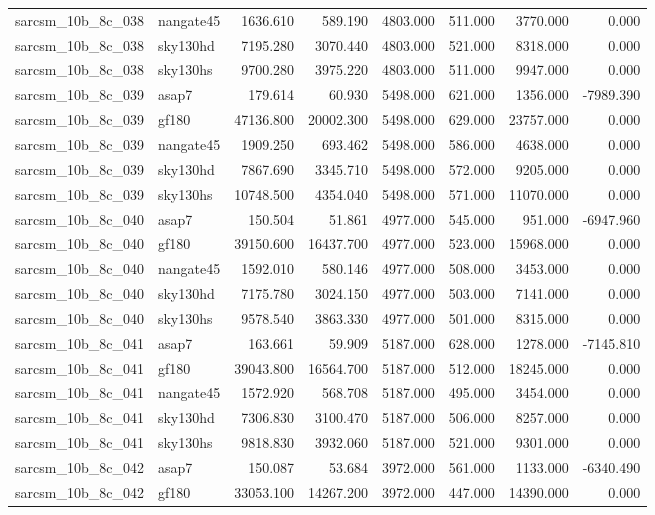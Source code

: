 \begin{tabular}{llrrrrrr}
sarcsm\_10b\_8c\_038 & nangate45 & 1636.610 & 589.190 & 4803.000 & 511.000 & 3770.000 & 0.000 \\
sarcsm\_10b\_8c\_038 & sky130hd & 7195.280 & 3070.440 & 4803.000 & 521.000 & 8318.000 & 0.000 \\
sarcsm\_10b\_8c\_038 & sky130hs & 9700.280 & 3975.220 & 4803.000 & 511.000 & 9947.000 & 0.000 \\
sarcsm\_10b\_8c\_039 & asap7 & 179.614 & 60.930 & 5498.000 & 621.000 & 1356.000 & -7989.390 \\
sarcsm\_10b\_8c\_039 & gf180 & 47136.800 & 20002.300 & 5498.000 & 629.000 & 23757.000 & 0.000 \\
sarcsm\_10b\_8c\_039 & nangate45 & 1909.250 & 693.462 & 5498.000 & 586.000 & 4638.000 & 0.000 \\
sarcsm\_10b\_8c\_039 & sky130hd & 7867.690 & 3345.710 & 5498.000 & 572.000 & 9205.000 & 0.000 \\
sarcsm\_10b\_8c\_039 & sky130hs & 10748.500 & 4354.040 & 5498.000 & 571.000 & 11070.000 & 0.000 \\
sarcsm\_10b\_8c\_040 & asap7 & 150.504 & 51.861 & 4977.000 & 545.000 & 951.000 & -6947.960 \\
sarcsm\_10b\_8c\_040 & gf180 & 39150.600 & 16437.700 & 4977.000 & 523.000 & 15968.000 & 0.000 \\
sarcsm\_10b\_8c\_040 & nangate45 & 1592.010 & 580.146 & 4977.000 & 508.000 & 3453.000 & 0.000 \\
sarcsm\_10b\_8c\_040 & sky130hd & 7175.780 & 3024.150 & 4977.000 & 503.000 & 7141.000 & 0.000 \\
sarcsm\_10b\_8c\_040 & sky130hs & 9578.540 & 3863.330 & 4977.000 & 501.000 & 8315.000 & 0.000 \\
sarcsm\_10b\_8c\_041 & asap7 & 163.661 & 59.909 & 5187.000 & 628.000 & 1278.000 & -7145.810 \\
sarcsm\_10b\_8c\_041 & gf180 & 39043.800 & 16564.700 & 5187.000 & 512.000 & 18245.000 & 0.000 \\
sarcsm\_10b\_8c\_041 & nangate45 & 1572.920 & 568.708 & 5187.000 & 495.000 & 3454.000 & 0.000 \\
sarcsm\_10b\_8c\_041 & sky130hd & 7306.830 & 3100.470 & 5187.000 & 506.000 & 8257.000 & 0.000 \\
sarcsm\_10b\_8c\_041 & sky130hs & 9818.830 & 3932.060 & 5187.000 & 521.000 & 9301.000 & 0.000 \\
sarcsm\_10b\_8c\_042 & asap7 & 150.087 & 53.684 & 3972.000 & 561.000 & 1133.000 & -6340.490 \\
sarcsm\_10b\_8c\_042 & gf180 & 33053.100 & 14267.200 & 3972.000 & 447.000 & 14390.000 & 0.000 \\

\end{tabular}
